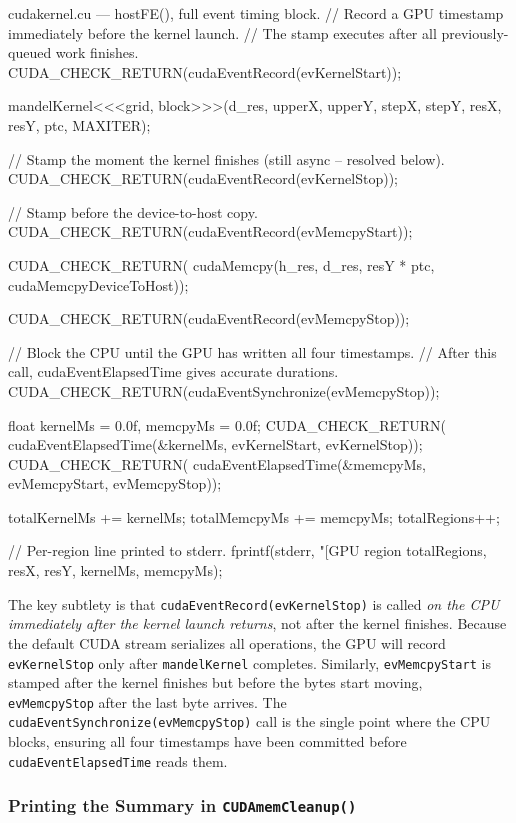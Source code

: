 \documentclass[
	english,
	letterpaper, oneside
]{article}
\begin{document}
\begin{sourcecode}{cuda}{kernel.cu — hostFE(), full event timing block.}
// Record a GPU timestamp immediately before the kernel launch.
// The stamp executes after all previously-queued work finishes.
CUDA_CHECK_RETURN(cudaEventRecord(evKernelStart));

mandelKernel<<<grid, block>>>(d_res, upperX, upperY,
                               stepX, stepY, resX, resY, ptc, MAXITER);

// Stamp the moment the kernel finishes (still async -- resolved below).
CUDA_CHECK_RETURN(cudaEventRecord(evKernelStop));

// Stamp before the device-to-host copy.
CUDA_CHECK_RETURN(cudaEventRecord(evMemcpyStart));

CUDA_CHECK_RETURN(
    cudaMemcpy(h_res, d_res, resY * ptc, cudaMemcpyDeviceToHost));

CUDA_CHECK_RETURN(cudaEventRecord(evMemcpyStop));

// Block the CPU until the GPU has written all four timestamps.
// After this call, cudaEventElapsedTime gives accurate durations.
CUDA_CHECK_RETURN(cudaEventSynchronize(evMemcpyStop));

float kernelMs = 0.0f, memcpyMs = 0.0f;
CUDA_CHECK_RETURN(
    cudaEventElapsedTime(&kernelMs, evKernelStart, evKernelStop));
CUDA_CHECK_RETURN(
    cudaEventElapsedTime(&memcpyMs, evMemcpyStart, evMemcpyStop));

totalKernelMs += kernelMs;
totalMemcpyMs += memcpyMs;
totalRegions++;

// Per-region line printed to stderr.
fprintf(stderr,
    "[GPU region %
    totalRegions, resX, resY, kernelMs, memcpyMs);
\end{sourcecode}

The key subtlety is that \texttt{cudaEventRecord(evKernelStop)} is called
\emph{on the CPU immediately after the kernel launch returns}, not after
the kernel finishes. Because the default CUDA stream serializes all
operations, the GPU will record \texttt{evKernelStop} only after
\texttt{mandelKernel} completes. Similarly, \texttt{evMemcpyStart} is
stamped after the kernel finishes but before the bytes start moving,
\texttt{evMemcpyStop} after the last byte arrives. The
\texttt{cudaEventSynchronize(evMemcpyStop)} call is the single point
where the CPU blocks, ensuring all four timestamps have been committed
before \texttt{cudaEventElapsedTime} reads them.

\subsubsection{Printing the Summary in \texttt{CUDAmemCleanup()}}
\end{document}
